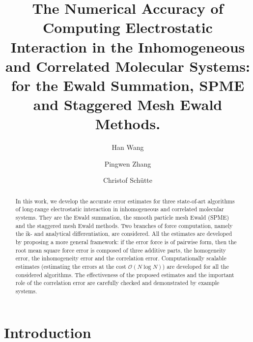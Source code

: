 \documentclass[aps,pre,preprint,unsortedaddress]{revtex4}
\newcommand{\redc}[1]{{\color{red} #1}}
\begin{document}
\title{The Numerical Accuracy of Computing Electrostatic Interaction
  in the Inhomogeneous and Correlated Molecular Systems:
  for the Ewald Summation, SPME and Staggered Mesh Ewald Methods.
}
\author{Han Wang}
\author{Pingwen Zhang}
\author{Christof Sch\"utte}

\begin{abstract}
  In this work, we develop the accurate error estimates for
  three state-of-art algorithms of long-range electrostatic interaction
  in inhomogeneous and correlated molecular systems.
  They are the Ewald summation, the smooth particle mesh Ewald (SPME) and
  the staggered mesh Ewald methods. Two branches of force computation, namely
  the ik- and analytical differentiation, are considered. All the
  estimates are developed by proposing a more general framework:
  if the error force is of pairwise form,
  then the root mean square force error is composed \redc{of} three additive parts,
  the homogeneity error, the inhomogeneity error and the correlation
  error. Computationally scalable estimates (estimating the errors
  at the cost $\mathcal O(N\log N)$) are developed for all the considered
  algorithms.
  The effectiveness of the proposed estimates and the important role of
  the correlation error are carefully checked and demonstrated by
  example systems.
\end{abstract}

\maketitle

\section{Introduction}
\end{document}
